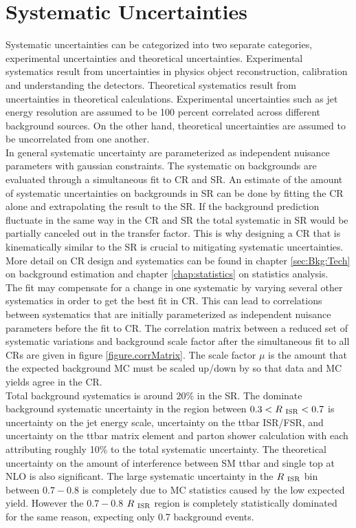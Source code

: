
\chapter{Systematic Uncertainties}
\label{chap:Uncertainties}

\indent Systematic uncertainties can be categorized into two separate categories, experimental uncertainties and theoretical uncertainties.  Experimental systematics result from uncertainties in physics object reconstruction, calibration and understanding the detectors.  Theoretical systematics result from uncertainties in theoretical calculations. Experimental uncertainties such as jet energy resolution are assumed to be 100 percent correlated across different background sources.  On the other hand, theoretical uncertainties are assumed to be uncorrelated from one another.  \\

\indent In general systematic uncertainty are parameterized as independent nuisance parameters with gaussian constraints.  The systematic on backgrounds are evaluated through a simultaneous fit to CR and SR.  An estimate of the amount of systematic uncertainties on backgrounds in SR can be done by fitting the CR alone and extrapolating the result to the SR.  If the background prediction fluctuate in the same way in the CR and SR the total systematic in SR would be partially canceled out in the transfer factor.  This is why designing a CR that is kinematically similar to the SR is crucial to mitigating systematic uncertainties.  More detail on CR design and systematics can be found in chapter \ref{sec:Bkg:Tech} on background estimation and chapter \ref{chap:statistics} on statistics analysis.  \\

\indent The fit may compensate for a change in one systematic by varying several other systematics in order to get the best fit in CR. This can lead to correlations between systematics that are initially parameterized as independent nuisance parameters before the fit to CR.  The correlation matrix between a reduced set of systematic variations and background scale factor after the simultaneous fit to all CRs are given in figure \ref{figure.corrMatrix}.  The scale factor $\mu$ is the amount that the expected background MC must be scaled up/down by so that data and MC yields agree in the CR.  \\

\indent Total background systematics is around $20\%$ in the SR.  The dominate background systematic uncertainty in the region between $0.3 < R_{~\mathrm{ISR}} < 0.7$ is uncertainty on the jet energy scale, uncertainty on the ttbar ISR/FSR, and uncertainty on the ttbar matrix element and parton shower calculation with each attributing roughly 10\% to the total systematic uncertainty.  The theoretical uncertainty on the amount of interference between SM ttbar and single top at NLO is also significant.  The large systematic uncertainty in the $R_{~\mathrm{ISR}}$ bin between $0.7-0.8$ is completely due to MC statistics caused by the low expected yield.  However the $0.7-0.8$ $R_{~\mathrm{ISR}}$ region is completely statistically dominated for the same reason, expecting only 0.7 background events.  \\

